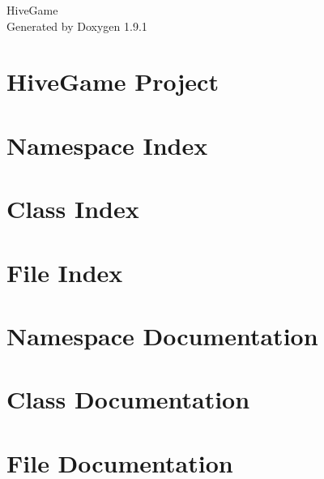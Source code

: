\let\mypdfximage\pdfximage\def\pdfximage{\immediate\mypdfximage}\documentclass[twoside]{book}
\newcommand{\+}{\discretionary{\mbox{\scriptsize$\hookleftarrow$}}{}{}}
\newcommand{\clearemptydoublepage}{%
  \newpage{\pagestyle{empty}\cleardoublepage}%
}
\begin{document}
\raggedbottom

\hypersetup{pageanchor=false,
             bookmarksnumbered=true,
             pdfencoding=unicode
            }
\begin{titlepage}
\vspace*{7cm}
\begin{center}%
{\Large Hive\+Game }\\
\vspace*{1cm}
{\large Generated by Doxygen 1.9.1}\\
\end{center}
\end{titlepage}
\clearemptydoublepage
{}
\tableofcontents
\clearemptydoublepage
{}
\hypersetup{pageanchor=true}

\chapter{Hive\+Game Project}
\label{index}\hypertarget{index}{}
\chapter{Namespace Index}

\chapter{Class Index}

\chapter{File Index}

\chapter{Namespace Documentation}



\chapter{Class Documentation}




\chapter{File Documentation}










\backmatter
\newpage
{}
\clearemptydoublepage
{}
\printindex
\end{document}
